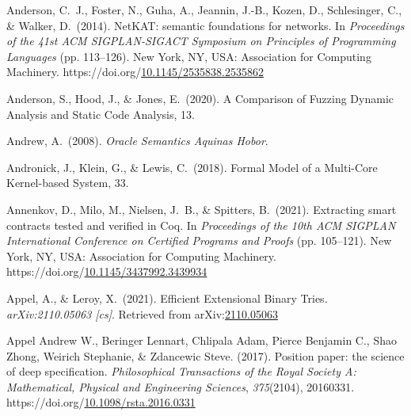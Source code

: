 \documentclass[12pt,twoside]{article}
\begin{document}
{\begin{thebibliography}{1079}
\mdbibitemlabel{}Anderson, C.~J., Foster, N., Guha, A., Jeannin, J.-B., Kozen, D., Schlesinger, C., \& Walker, D.~(2014). NetKAT: semantic foundations for networks. In \emph{Proceedings of the 41st ACM SIGPLAN-SIGACT Symposium on Principles of Programming Languages} (pp. 113–126). New York, NY, USA: Association for Computing Machinery. https://doi.org/\href{https://dx.doi.org/10.1145/2535838.2535862}{10.1145/2535838.2535862}%

\mdbibitemlabel{}Anderson, S., Hood, J., \& Jones, E.~(2020). A Comparison of Fuzzing Dynamic Analysis and Static Code Analysis, 13.%

\mdbibitemlabel{}Andrew, A.~(2008). \emph{Oracle Semantics Aquinas Hobor}.%

\mdbibitemlabel{}Andronick, J., Klein, G., \& Lewis, C.~(2018). Formal Model of a Multi-Core Kernel-based System, 33.%

\mdbibitemlabel{}Annenkov, D., Milo, M., Nielsen, J.~B., \& Spitters, B.~(2021). Extracting smart contracts tested and verified in Coq. In \emph{Proceedings of the 10th ACM SIGPLAN International Conference on Certified Programs and Proofs} (pp. 105–121). New York, NY, USA: Association for Computing Machinery. https://doi.org/\href{https://dx.doi.org/10.1145/3437992.3439934}{10.1145/3437992.3439934}%

\mdbibitemlabel{}Appel, A., \& Leroy, X.~(2021). Efficient Extensional Binary Tries. \emph{arXiv:2110.05063 {}[cs]}. Retrieved from arXiv:\href{http://arxiv.org/abs/2110.05063}{2110.05063}%

\mdbibitemlabel{}Appel Andrew W., Beringer Lennart, Chlipala Adam, Pierce Benjamin C., Shao Zhong, Weirich Stephanie, \& Zdancewic Steve. (2017). Position paper: the science of deep specification. \emph{Philosophical Transactions of the Royal Society A: Mathematical, Physical and Engineering Sciences}, \emph{375}(2104), 20160331. https://doi.org/\href{https://dx.doi.org/10.1098/rsta.2016.0331}{10.1098/rsta.2016.0331}%


\end{thebibliography}}
\end{document}
